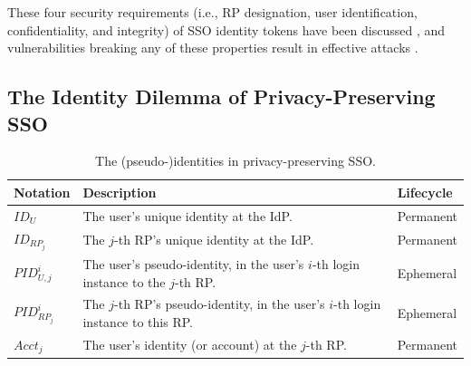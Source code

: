 These four security requirements (i.e., RP designation, user identification, confidentiality, and integrity) of SSO identity tokens
     have been discussed \cite{ArmandoCCCT08,FettKS16, FettKS17},
     and
     vulnerabilities breaking any of these properties 
            result in effective attacks \cite{SomorovskyMSKJ12, WangCW12, ArmandoCCCPS13, ZhouE14, WangZLLYLG15, WangZLG16, YangLLZH16, MainkaMS16, MainkaMSW17, YangLCZ18, YangLS17, ShiWL19, ChenPCTKT14, ccsSunB12, DiscoveringJCS, dimvaLiM16, CaoSBKVC14, TowardsShehabM14}.




\subsection{The Identity Dilemma of Privacy-Preserving SSO}
\label{subsec:challenges}
\begin{table}[t]
\footnotesize
    \caption{The (pseudo-)identities in privacy-preserving SSO.}
    \centering
    \begin{tabular}{|p{1.0cm}|p{5.1cm}|p{1.13cm}|} \hline
    {\textbf{Notation}} & {\textbf{Description}} & {\textbf{Lifecycle}} \\ \hline
    {$ID_U$} & {The user's unique identity at the IdP.} & {Permanent} \\ \hline
    {$ID_{RP_j}$} & {The $j$-th RP's unique identity at the IdP.} & {Permanent} \\ \hline
    {$PID_{U,j}^i$} & {The user's pseudo-identity, in the user's $i$-th login instance to the $j$-th RP.} & {Ephemeral} \\ \hline
    {$PID_{RP_j}^i$} & {The $j$-th RP's pseudo-identity, in the user's $i$-th login instance to this RP.} & {Ephemeral} \\ \hline
    {$Acct_j$} & {The user's identity (or account) at the $j$-th RP.} & {Permanent} \\ \hline
    \end{tabular}
    \label{tbl:notations-dilemma}
\end{table}



